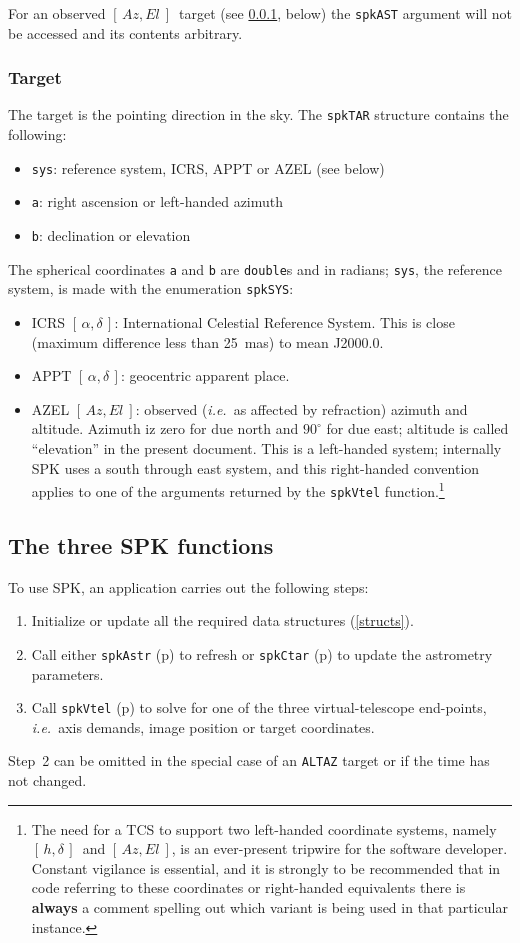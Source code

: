 \documentclass[11pt,fleqn,twoside,\paper]{article}
\renewcommand{\_}{{\tt\char'137}}     %
\newcommand{\radec}     {$[\,\alpha,\delta\,]$}
\newcommand{\hadec}     {$[\,h,\delta\,]$}
\newcommand{\azel}      {$[\,Az,El~]$}
\newcommand{\degi}[1]   {$#1^{\circ}$}
\begin{document}
For an observed \azel\ target (see \ref{target}, below) the
{\tt spkAST} argument will not be accessed and its contents
arbitrary.

\subsubsection{Target}
\label{target}

The target is the pointing direction in the sky.  The {\tt spkTAR}
structure contains the following:
\begin{itemize}
\item {\tt sys}: reference system, ICRS, APPT or AZEL (see below)
\item {\tt a}: right ascension or left-handed azimuth
\item {\tt b}: declination or elevation
\end{itemize}
The spherical coordinates {\tt a} and {\tt b} are {\tt double}s
and in radians; {\tt sys}, the reference system, is made with the
enumeration {\tt spkSYS}:
\begin{itemize}
\item ICRS \radec:  International Celestial Reference System.  This is
close (maximum difference less than 25~mas) to mean J2000.0.
\item APPT \radec: geocentric apparent place.
\item AZEL \azel: observed ({\it i.e.}~as affected by refraction)
azimuth and altitude.  Azimuth iz zero for due north and \degi{90} for
due east;  altitude is called ``elevation'' in the present
document.  This is a left-handed system;  internally SPK uses a south
through east system, and this right-handed convention applies to
one of the arguments returned by the {\tt spkVtel}
function.\footnote{The need for a TCS to support two left-handed
coordinate systems, namely \hadec\ and \azel, is an ever-present
tripwire for the software developer.  Constant vigilance is
essential, and it is strongly to be recommended that in code
referring to these coordinates or right-handed equivalents there
is {\bf always} a comment spelling out which variant is being used
in that particular instance.}
\end{itemize}

\subsection{The three SPK functions}
\label{funcs}

To use SPK, an application carries out the following steps:
\begin{enumerate}
\item Initialize or update all the required data structures
(\ref{structs}).
\item Call either {\tt spkAstr} (p\pageref{spkAstr}) to
refresh or {\tt spkCtar} (p\pageref{spkCtar}) to update the
astrometry parameters.
\item Call {\tt spkVtel} (p\pageref{spkVtel})
to solve for one of the three virtual-telescope
end-points, {\it i.e.}~axis demands, image position or
target coordinates.
\end{enumerate}
Step~2 can be omitted in the special case of an {\tt ALTAZ}
target or if the time has not changed.
\end{document}
